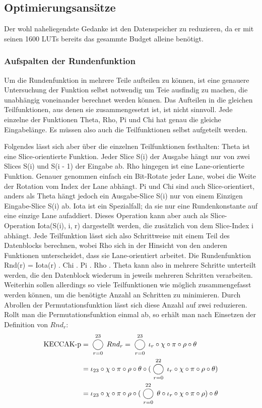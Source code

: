 \subsection{Optimierungsansätze}
Der wohl naheliegendste Gedanke ist den Datenspeicher zu reduzieren, da er mit seinen 1600 LUTs bereits das gesammte Budget alleine benötigt.

\subsubsection{Aufspalten der Rundenfunktion}
Um die Rundenfunktion in mehrere Teile aufteilen zu können, ist eine genauere Untersuchung der Funktion selbst notwendig um Teie ausfindig zu machen,
die unabhängig voneinander berechnet werden können. Das Aufteilen in die gleichen Teilfunktionen, aus denen sie zusammengesetzt ist, ist nicht sinnvoll.
Jede einzelne der Funktionen Theta, Rho, Pi und Chi hat genau die gleiche Eingabelänge. Es müssen also auch die Teilfunktionen selbst aufgeteilt werden.

Folgendes lässt sich aber über die einzelnen Teilfunktionen festhalten:
Theta ist eine Slice-orientierte Funktion.
Jeder Slice S(i) der Ausgabe hängt nur von zwei Slices S(i) und S(i - 1) der Eingabe ab.
Rho hingegen ist eine Lane-orientierte Funktion. Genauer genommen einfach ein Bit-Rotate jeder Lane, wobei die Weite der Rotation vom Index der Lane abhängt.
Pi und Chi sind auch Slice-orientiert, anders als Theta hängt jedoch ein Ausgabe-Slice S(i) nur von einem Einzigen Eingabe-Slice S(i) ab.
Iota ist ein Spezialfall; da sie nur eine Rundenkonstante auf eine einzige Lane aufaddiert.
Dieses Operation kann aber auch als Slice-Operation Iota(S(i), i, r) dargestellt werden, die zusätzlich von dem Slice-Index i abhängt.
Jede Teilfunktion lässt sich also Schrittweise mit einem Teil des Datenblocks berechnen, wobei Rho sich in der Hinsicht von den anderen Funktionen unterscheidet,
dass sie Lane-orientiert arbeitet. Die Rundenfunktion Rnd(r) = Iota(r) . Chi . Pi . Rho . Theta kann also in mehrere Schritte unterteilt werden,
die den Datenblock wiederum in jeweils mehreren Schritten verarbeiten. Weiterhin sollen allerdings so viele Teilfunktionen wie möglich
zusammengefasst werden können, um die benötigte Anzahl an Schritten zu minimieren. Durch Abrollen der Permutationsfunktion lässt sich diese Anzahl auf zwei reduzieren.
Rollt man die Permutationsfunktion
einmal ab, so erhält man nach Einsetzen der Definition von $Rnd_r$:
\begin{align*}
    \text{KECCAK-p} & = \bigcomp_{r = 0}^{23} Rnd_r = \bigcomp_{r = 0}^{23} \iota_r \circ \chi \circ \pi \circ \rho \circ \theta \\
    & = \iota_{23} \circ \chi \circ \pi \circ \rho \circ \theta \circ (\bigcomp_{r = 0}^{22} \iota_r \circ \chi \circ \pi \circ \rho \circ \theta) \\
    & = \iota_{23} \circ \chi \circ \pi \circ \rho \circ (\bigcomp_{r = 0}^{22} \theta \circ \iota_r \circ \chi \circ \pi \circ \rho) \circ \theta
\end{align*}


